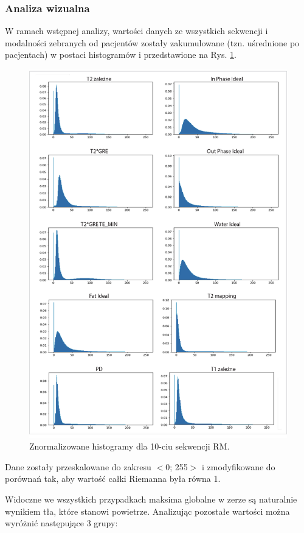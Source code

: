 \subsubsection{Analiza wizualna} W ramach wstępnej analizy, wartości danych ze wszystkich sekwencji i modalności zebranych od pacjentów zostały zakumulowane (tzn. uśrednione po pacjentach) w postaci  histogramów i przedstawione na Rys. \ref{fig:Hists}.
\begin{figure}[]
	\centering
	\includegraphics[width=1\textwidth]{figures/Hists.jpg}
	\caption{Znormalizowane histogramy dla 10-ciu sekwencji RM.}\label{fig:Hists}
\end{figure}
Dane zostały przeskalowane do zakresu $<$0; 255$>$ i zmodyfikowane do porównań tak, aby wartość całki Riemanna była równa 1.

Widoczne we wszystkich przypadkach maksima globalne w zerze są naturalnie wynikiem tła, które stanowi powietrze. Analizując pozostałe wartości można wyróżnić następujące 3 grupy:

